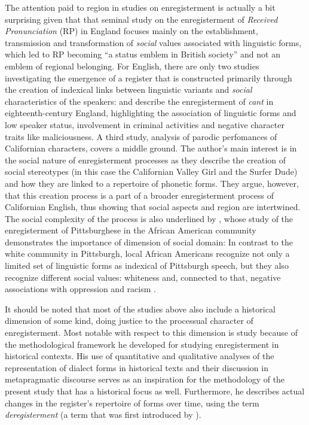 The attention paid to region in studies on enregisterment is actually a bit surprising given that that  seminal study on the enregisterment of \textit{Received Pronunciation} (RP) in England focuses mainly on the establishment, transmission and transformation of \emph{social} values associated with linguistic forms, which led to RP becoming “a status emblem in British society” \citep[231]{Agha2003} and not an emblem of regional belonging. For English, there are only two studies investigating the emergence of a register that is constructed primarily through the creation of indexical links between linguistic variants and \textit{social} characteristics of the speakers: \citet{SchintuMartinez2016} and \citet{But2017} describe the enregisterment of \textit{cant} in eighteenth-century England, highlighting the association of linguistic forms and low speaker status, involvement in criminal activities and negative character traits like maliciousness. A third study,  analysis of parodic perfomances of Californian characters, covers a middle ground. The author’s main interest is in the social nature of enregisterment processes as they describe the creation of social stereotypes (in this case the Californian Valley Girl and the Surfer Dude) and how they are linked to a repertoire of phonetic forms. They argue, however, that this creation process is a part of a broader enregisterment process of Californian English, thus showing that social aspects and region are intertwined. The social complexity of the process is also underlined by \citet{Eberhardt2012}, whose study of the enregisterment of Pittsburghese in the African American community demonstrates the importance of  dimension of social domain: In contrast to the white community in Pittsburgh, local African Americans recognize not only a limited set of linguistic forms as indexical of Pittsburgh speech, but they also recognize different social values: whiteness and, connected to that, negative associations with oppression and racism \citep[367]{Eberhardt2012}.

It should be noted that most of the studies above also include a historical dimension of some kind, doing justice to the processual character of enregisterment. Most notable with respect to this dimension is  study because of the methodological framework he developed for studying enregisterment in historical contexts. His use of quantitative and qualitative analyses of the representation of dialect forms in historical texts and their discussion in metapragmatic discourse serves as an inspiration for the methodology of the present study that has a historical focus as well. Furthermore, he describes actual changes in the register’s repertoire of forms over time, using the term \textit{deregisterment} (a term that was first introduced by \citealt{Williams2012}).

